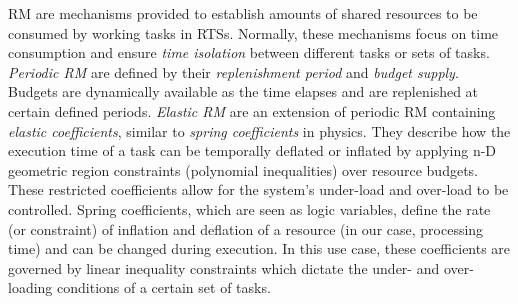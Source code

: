 \newcommand\acp{}
\newcommand\ac{}
\newcommand\ref{}

  \ac{RM} are mechanisms provided to establish amounts of shared resources to be consumed by working tasks in \ac{RTS}s.  Normally, these mechanisms focus on time consumption and ensure \emph{time isolation} between different tasks or sets of tasks. %
  \emph{Periodic \acp{RM}} are defined by their \emph{replenishment period} and \emph{budget supply}. Budgets are dynamically available as the time elapses and are replenished at certain defined periods.
\emph{Elastic \acp{RM}} are an extension of periodic \acp{RM} containing \emph{elastic coefficients}, similar to {\em spring coefficients} in physics. They describe how the execution time of a task can be temporally deflated or inflated by applying n-D geometric region constraints (polynomial inequalities) over resource budgets. These restricted coefficients allow for the system's under-load and over-load to be controlled.
Spring coefficients, which are seen as logic variables, define the rate (or constraint) of inflation and deflation of a resource (in our case, processing time) and can be changed during execution. In this use case, these coefficients are governed by linear inequality constraints which dictate the under- and over-loading conditions of a certain set of tasks.

